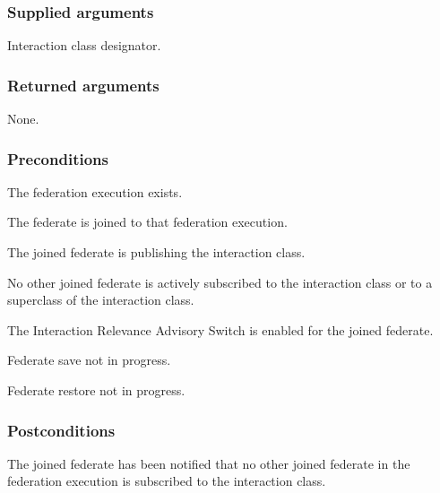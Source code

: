 \begin{compactstdpage}
    \subsubsection{Supplied arguments}
    \begin{stdalphalist}
        \item Interaction class designator.
    \end{stdalphalist}

    \subsubsection{Returned arguments}
    \begin{stdalphalist}
        \item None.
    \end{stdalphalist}

    \subsubsection{Preconditions}
    \begin{stdalphalist}
        \item The federation execution exists.
        \item The federate is joined to that federation execution.
        \item The joined federate is publishing the interaction class.
        \item No other joined federate is actively subscribed to the interaction class or to a superclass of the interaction class.
        \item The Interaction Relevance Advisory Switch is enabled for the joined federate.
        \item Federate save not in progress.
        \item Federate restore not in progress.
    \end{stdalphalist}

    \subsubsection{Postconditions}
    \begin{stdalphalist}
        \item The joined federate has been notified that no other joined federate in the federation execution is subscribed to the interaction class.
    \end{stdalphalist}
\end{compactstdpage}

